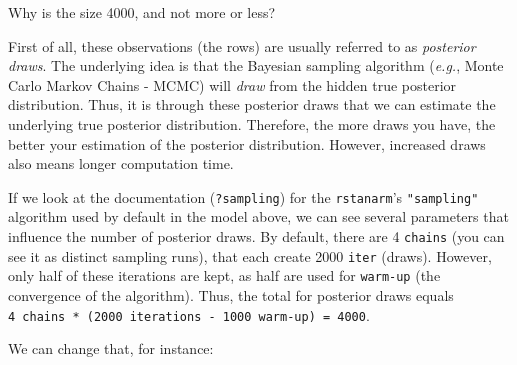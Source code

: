 \documentclass[10pt,a4paper,onecolumn]{article}
\begin{document}
Why is the size 4000, and not more or less?

First of all, these observations (the rows) are usually referred to as
\emph{posterior draws}. The underlying idea is that the Bayesian
sampling algorithm (\emph{e.g.}, Monte Carlo Markov Chains - MCMC) will
\emph{draw} from the hidden true posterior distribution. Thus, it is
through these posterior draws that we can estimate the underlying true
posterior distribution. Therefore, the more draws you have, the better
your estimation of the posterior distribution. However, increased draws
also means longer computation time.

If we look at the documentation (\texttt{?sampling}) for the
\texttt{rstanarm}'s \texttt{"sampling"} algorithm used by default in the
model above, we can see several parameters that influence the number of
posterior draws. By default, there are 4 \texttt{chains} (you can see it
as distinct sampling runs), that each create 2000 \texttt{iter} (draws).
However, only half of these iterations are kept, as half are used for
\texttt{warm-up} (the convergence of the algorithm). Thus, the total for
posterior draws equals
\texttt{4\ chains\ *\ (2000\ iterations\ -\ 1000\ warm-up)\ =\ 4000}.

We can change that, for instance:
\end{document}
